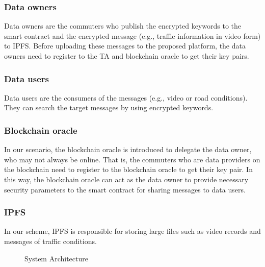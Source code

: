 \documentclass[journal,10pt]{IEEEtran}
\begin{document}
\subsubsection{\textbf{Data owners}}
Data owners are the commuters who publish the encrypted keywords to the smart contract and the encrypted message (e.g., traffic information in video form) to IPFS. Before uploading these messages to the proposed platform, the data owners need to register to the TA and blockchain oracle to get their key pairs.
\subsubsection{\textbf{Data users}}
Data users are the consumers of the messages (e.g., video or road conditions). They can search the target messages by using encrypted keywords.
\subsubsection{\textbf{Blockchain oracle}}
In our scenario, the blockchain oracle is introduced to delegate the data owner, who may not always be online. That is, the commuters who are data providers on the blockchain need to register to the blockchain oracle to get their key pair. In this way, the blockchain oracle can act as the data owner to provide necessary security parameters to the smart contract for sharing messages to data users.
\subsubsection{\textbf{IPFS}}
In our scheme, IPFS is responsible for storing large files such as video records and messages of traffic conditions. 

\begin{figure}[h!]
    \centering
    \caption{System Architecture}
    \label{fig:architecture}
\end{figure}
\end{document}
